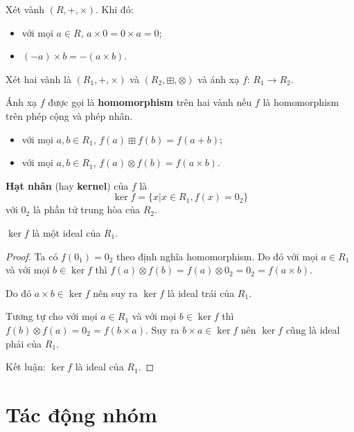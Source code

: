 Xét vành $(R, +, \times)$. Khi đó:

\begin{itemize}
    \item với mọi $a \in R$, $a \times 0 = 0 \times a = 0$;
    \item $(-a) \times b = - (a \times b)$.
\end{itemize}

\begin{definition}
    Xét hai vành là $(R_1, +, \times)$ và $(R_2, \boxplus, \otimes)$ và ánh xạ $f: \, R_1 \to R_2$.
    
    Ánh xạ $f$ được gọi là \textbf{homomorphism} trên hai vành nếu $f$ là homomorphism trên phép cộng và phép nhân.
    \begin{itemize}
        \item với mọi $a, b \in R_1$, $f(a) \boxplus f(b) = f(a + b)$;
        \item với mọi $a, b \in R_1$, $f(a) \otimes f(b) = f(a \times b)$.
    \end{itemize}
\end{definition}

\begin{definition}
    \textbf{Hạt nhân} (hay \textbf{kernel}) của $f$ là
    \begin{equation*}
        \ker f = \{x \vert x \in R_1, f(x) = 0_{2}\}
    \end{equation*}
    với $0_{2}$ là phần tử trung hòa của $R_2$.
\end{definition}

\begin{theorem}
    $\ker f$ là một ideal của $R_1$.
\end{theorem}

\begin{proof}
    Ta có $f(0_1) = 0_2$ theo định nghĩa homomorphism. Do đó với mọi $a \in R_1$ và với mọi $b \in \ker f$ thì $f(a) \otimes f(b) = f(a) \otimes 0_2 = 0_2 = f(a \times b)$. 
    
    Do đó $a \times b \in \ker f$ nên suy ra $\ker f$ là ideal trái của $R_1$.

    Tương tự cho với mọi $a \in R_1$ và với mọi $b \in \ker f$ thì $f(b) \otimes f(a) = 0_2 = f(b \times a)$. Suy ra $b \times a \in \ker f$ nên $\ker f$ cũng là ideal phải của $R_1$.

    Kết luận: $\ker f$ là ideal của $R_1$.
\end{proof}

\section{Tác động nhóm}

